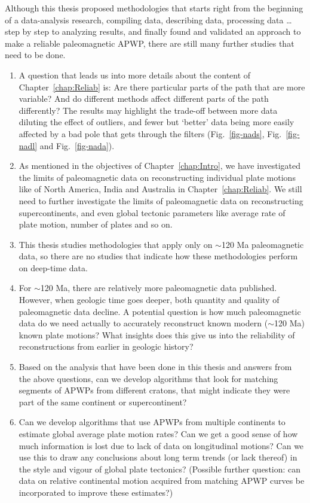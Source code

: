Although this thesis proposed methodologies that starts right from the
beginning of a data-analysis research, compiling data, describing data,
processing data \ldots step by step to analyzing results, and finally found and
validated an approach to make a reliable paleomagnetic APWP, there are still
many further studies that need to be done.
%
\begin{enumerate}
  \item A question that leads us into more details about the content of
  Chapter~\ref{chap:Reliab} is: Are there particular parts of the path that are
  more variable? And do different methods affect different parts of the path
  differently? The results may highlight the trade-off between more data
  diluting the effect of outliers, and fewer but `better' data being more easily
  affected by a bad pole that gets through the filters (Fig.~\ref{fig-nads},
  Fig.~\ref{fig-nadl} and Fig.~\ref{fig-nada}).
  \item As mentioned in the objectives of Chapter~\ref{chap:Intro}, we have
  investigated the limits of paleomagnetic data on reconstructing individual
  plate motions like of North America, India and Australia in
  Chapter~\ref{chap:Reliab}. We still need to further investigate the limits of
  paleomagnetic data on reconstructing supercontinents, and even global tectonic
  parameters like average rate of plate motion, number of plates and so on.
  \item This thesis studies methodologies that apply only on
  $\sim$120 Ma paleomagnetic data, so there are no studies that
  indicate how these methodologies perform on deep-time data.
  \item For $\sim$120 Ma, there are relatively more paleomagnetic
  data published. However, when geologic time goes deeper, both quantity and
  quality of paleomagnetic data decline. A potential question is how much
  paleomagnetic data do we need actually to accurately reconstruct known modern
  ($\sim$120 Ma) known plate motions? What insights does this give
  us into the reliability of reconstructions from earlier in geologic history?
  \item Based on the analysis that have been done in this thesis and answers
  from the above questions, can we develop algorithms that look for matching
  segments of APWPs from different cratons, that might indicate they were part
  of the same continent or supercontinent?
  \item Can we develop algorithms that use APWPs from multiple continents to
  estimate global average plate motion rates? Can we get a good sense of how
  much information is lost due to lack of data on longitudinal motions? Can we
  use this to draw any conclusions about long term trends (or lack thereof) in
  the style and vigour of global plate tectonics? (Possible further question:
  can data on relative continental motion acquired from matching APWP curves be
  incorporated to improve these estimates?)
\end{enumerate}
